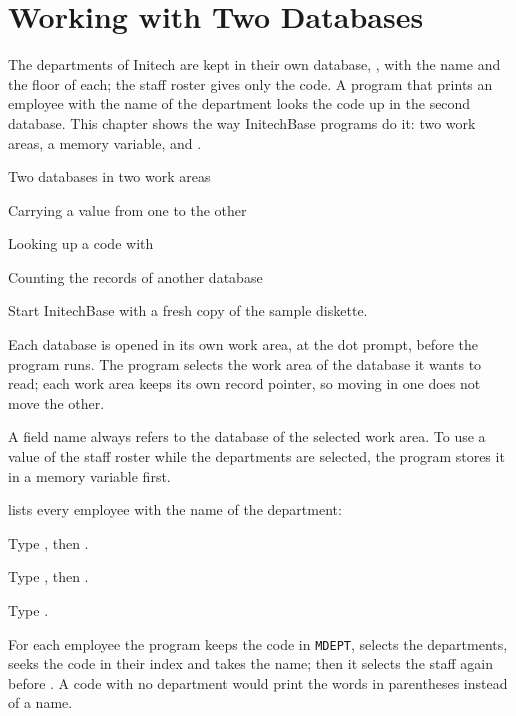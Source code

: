\chapter{Working with Two Databases}
The departments of Initech are kept in their own database, ,
with the name and the floor of each; the staff roster gives only the code.  A
program that prints an employee with the name of the department looks the code
up in the second database.  This chapter shows the way InitechBase programs do
it: two work areas, a memory variable, and .

\begin{ChapterCovers}
\item Two databases in two work areas
\item Carrying a value from one to the other
\item Looking up a code with 
\item Counting the records of another database
\end{ChapterCovers}

Start InitechBase with a fresh copy of the sample diskette.

Each database is opened in its own work area, at the dot prompt, before the
program runs.  The program selects the work area of the database it wants to
read; each work area keeps its own record pointer, so moving in one does not
move the other.

A field name always refers to the database of the selected work area.  To use
a value of the staff roster while the departments are selected, the program
stores it in a memory variable first.

 lists every employee with the name of the department:
\begin{Steps}
\item Type , then .
\item Type , then .
\item Type .
\end{Steps}
For each employee the program keeps the code in \texttt{MDEPT}, selects the
departments, seeks the code in their index and takes the name; then it selects
the staff again before .  A code with no department would print the
words in parentheses instead of a name.

